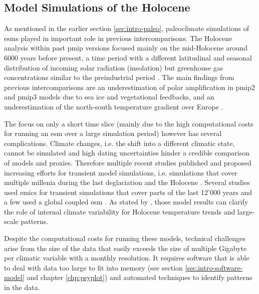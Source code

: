 \begin{refsection}
\subsection{Model Simulations of the Holocene}  \label{sec:intro-paleo-model}
As mentioned in the earlier section \ref{sec:intro-paleo}, paleoclimate simulations of \glspl{esm} played in important role in previous intercomparisons. The Holocene analysis within past \gls{pmip} versions focused mainly on the mid-Holocene around 6000 years before present, a time period with a different latitudinal and seasonal distribution of incoming solar radiation (insolation) but greenhouse gas concentrations similar to the preindustrial period \citep{Otto-BliesnerBraconnotHarrisonEtAl2017}. The main findings from previous intercomparisons are an underestimation of polar amplification in \gls{pmip}2 and \gls{pmip}3 models due to sea ice and vegetational feedbacks, and an underestimation of the north-south temperature gradient over Europe \citep{ClimateChange2014a, MassonDelmotteKageyamaBraconnotEtAl2006, ZhangSundqvistMobergEtAl2010, BrewerGuiotTorre2007, DavisBrewer2009}.

The focus on only a short time slice (mainly due to the high computational costs for running an \gls{esm} over a large simulation period) however has several complications. Climate changes, i.e. the shift into a different climatic state, cannot be simulated and high dating uncertainties hinder a credible comparison of models and proxies\addref. Therefore multiple recent studies published and proposed increasing efforts for transient model simulations, i.e. simulations that cover multiple millenia during the last deglaciation \citep{IvanovicGregoireKageyamaEtAl2016} and the Holocene \citep{Otto-BliesnerBraconnotHarrisonEtAl2017}. Several studies used \glspl{emic} for transient simulations that cover parts of the last 12'000 years \citep[e.g.][]{RocheRenssenPaillardEtAl2011, MenvielTimmermannTimmEtAl2011, GregoireValdesPayne2015} and a few used a global coupled \gls{esm} \citep{VarmaPrangeMerkelEtAl2012, OttoBliesnerRussellClarkEtAl2014}. As stated by \cite{WeitzelWagnerSjolteEtAl2019}, those model results can clarify the role of internal climate variability for Holocene temperature trends and large-scale patterns.

Despite the computational costs for running these models, technical challenges arise from the size of the data that easily exceeds the size of multiple Gigabyte per climatic variable with a monthly resolution. It requires software that is able to deal with data too large to fit into memory (see section \ref{sec:intro-software-model} and chapter \ref{chp:psyplot}) and automated techniques to identify patterns in the data.



\end{refsection}
